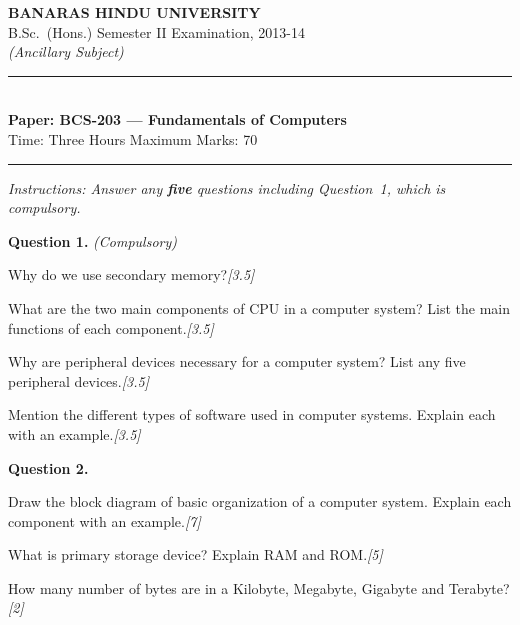 \documentclass[11pt,a4paper]{article}
\newcommand{\pts}[1]{\hfill   \textit{[#1]}}
\begin{document}
\begin{center}
  {\large\bfseries BANARAS HINDU UNIVERSITY}\\[2pt]
  {\normalsize B.Sc.\ (Hons.) Semester II Examination, 2013-14}\\[4pt]
  {\small   \textit{(Ancillary Subject)}}\\[6pt]
  \rule{0.8\linewidth}{0.5pt}\\[6pt]
  {\large\bfseries Paper: BCS-203 --- Fundamentals of Computers}\\[4pt]
  {\normalsize Time: Three Hours \hfill Maximum Marks: 70}
\end{center}

\rule{\linewidth}{0.4pt}

\smallskip



\noindent   \textit{Instructions: Answer any   \textbf{five} questions including Question~1, which is compulsory.}

\bigskip




\noindent   \textbf{Question 1.}   \textit{(Compulsory)}

\begin{parts}
  \item Why do we use secondary memory?\pts{3.5}
  \item What are the two main components of CPU in a computer system? List the main functions of each component.\pts{3.5}
  \item Why are peripheral devices necessary for a computer system? List any five peripheral devices.\pts{3.5}
  \item Mention the different types of software used in computer systems. Explain each with an example.\pts{3.5}
\end{parts}

\bigskip




\noindent   \textbf{Question 2.}

\begin{parts}
  \item Draw the block diagram of basic organization of a computer system. Explain each component with an example.\pts{7}
  \item What is primary storage device? Explain RAM and ROM.\pts{5}
  \item How many number of bytes are in a Kilobyte, Megabyte, Gigabyte and Terabyte?\pts{2}
\end{parts}
\end{document}
